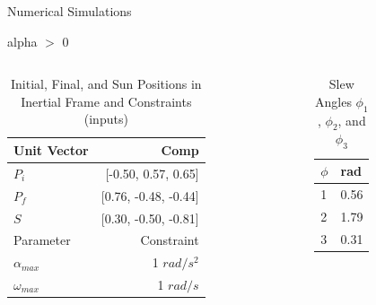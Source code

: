 \documentclass{beamer}
\begin{document}
\begin{frame}{Numerical Simulations}
	\begin{block}{alpha $>$ 0}
		
		\begin{columns}
			\begin{column}{0.7\textwidth}
				\begin{center}
					\begin{table}[H]
						\centering
						\caption{Initial, Final, and Sun Positions in Inertial Frame and Constraints (inputs)}
						\begin{tabular}{lr}
							\toprule
							\midrule
							Unit Vector & Comp \\
							\midrule
							$P_i$ & [-0.50, 0.57, 0.65] \\
							$P_f$ & [0.76, -0.48, -0.44] \\ 
							$S$ & [0.30, -0.50, -0.81] \\
							\midrule
							\midrule
							Parameter & Constraint \\ 
							\midrule
							$\alpha_{max}$ & 1 $rad/s^2$ \\
							$\omega_{max}$ & 1 $rad/s$ \\ 
							\midrule
							\bottomrule
						\end{tabular}%
						\label{tab:Pi_Pf_S}%
					\end{table}
				\end{center}
			\end{column}
			\begin{column}{0.3\textwidth}
				\begin{center}
					\begin{table}[H]
						\centering
						\caption{Slew Angles $\phi_1$, $\phi_2$, and $\phi_3$}
						\begin{tabular}{ll}
							\toprule
							\midrule
							$\phi$ & rad \\
							\midrule
							1 & 0.56 \\
							2 & 1.79 \\ 
							3 & 0.31 \\
							\midrule
							\bottomrule
						\end{tabular}%
						\label{tab:phi_123}%
					\end{table}%
				\end{center}
			\end{column}
		\end{columns}

	\end{block}
\end{frame}
\end{document}
